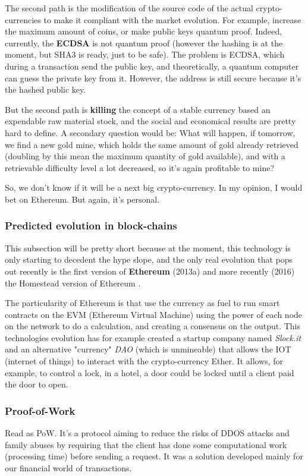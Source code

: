 The second path is the modification of the source code of the actual crypto-currencies to make it compliant with the market evolution. For example, increase the maximum amount of coins, or make public keys quantum proof. Indeed, currently, the \textbf{ECDSA} is not quantum proof (however the hashing is at the moment, but SHA3 is ready, just to be safe). The problem is ECDSA, which during a transaction send the public key, and theoretically, a quantum computer can guess the private key from it. However, the address is still secure because it's the hashed public key.

But the second path is \textbf{killing} the concept of a stable currency based an expendable raw material stock, and the social and economical results are pretty hard to define. A secondary question would be: What will happen, if tomorrow, we find a new gold mine, which holds the same amount of gold already retrieved (doubling by this mean the maximum quantity of gold available), and with a retrievable difficulty level a lot decreased, so it's again profitable to mine?

So, we don't know if it will be a next big crypto-currency. In my opinion, I would bet on Ethereum. But again, it's personal.

\subsubsection{Predicted evolution in block-chains}
This subsection will be pretty short because at the moment, this technology is only starting to decedent the hype slope, and the only real evolution that pops out recently is the first version of  \textbf{Ethereum}\cite{VitalikButerin2013APlatform} (2013a) and more recently (2016) the Homestead version of Ethereum \cite{DR.GAVINWOOD2015ETHEREUM:DRAFT}.

The particularity of Ethereum is that use the currency as fuel to run smart contracts on the EVM (Ethereum Virtual Machine) using the power of each node on the network to do a calculation, and creating a consensus on the output. This technologies evolution has for example created a startup company named \textit{Slock.it} and an alternative "currency" \textit{DAO} (which is unmineable) that allows the IOT (internet of things) to interact with the crypto-currency Ether. It allows, for example, to control a lock, in a hotel, a door could be locked until a client paid the door to open.

\subsubsection{Proof-of-Work}
Read as PoW\cite{Dwork1993PricingMail, Jakobsson1999ProofsAbstract}. It's a protocol aiming to reduce the risks of DDOS attacks and family abuses by requiring that the client has done some computational work (processing time) before sending a request. It was a solution developed mainly for our financial world of transactions.

